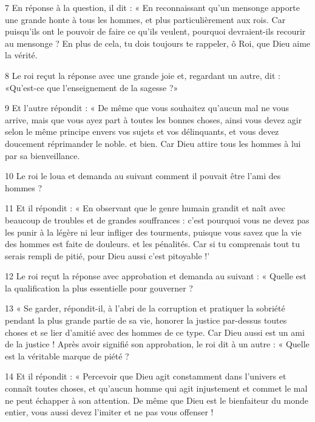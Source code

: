 \par 7 En réponse à la question, il dit : « En reconnaissant qu'un mensonge apporte une grande honte à tous les hommes, et plus particulièrement aux rois. Car puisqu’ils ont le pouvoir de faire ce qu’ils veulent, pourquoi devraient-ils recourir au mensonge ? En plus de cela, tu dois toujours te rappeler, ô Roi, que Dieu aime la vérité.

\par 8 Le roi reçut la réponse avec une grande joie et, regardant un autre, dit : «Qu'est-ce que l'enseignement de la sagesse ?»

\par 9 Et l'autre répondit : « De même que vous souhaitez qu'aucun mal ne vous arrive, mais que vous ayez part à toutes les bonnes choses, ainsi vous devez agir selon le même principe envers vos sujets et vos délinquants, et vous devez doucement réprimander le noble. et bien. Car Dieu attire tous les hommes à lui par sa bienveillance.

\par 10 Le roi le loua et demanda au suivant comment il pouvait être l'ami des hommes ?

\par 11 Et il répondit : « En observant que le genre humain grandit et naît avec beaucoup de troubles et de grandes souffrances : c'est pourquoi vous ne devez pas les punir à la légère ni leur infliger des tourments, puisque vous savez que la vie des hommes est faite de douleurs. et les pénalités. Car si tu comprenais tout tu serais rempli de pitié, pour Dieu aussi c'est pitoyable !'

\par 12 Le roi reçut la réponse avec approbation et demanda au suivant : « Quelle est la qualification la plus essentielle pour gouverner ?

\par 13 « Se garder, répondit-il, à l'abri de la corruption et pratiquer la sobriété pendant la plus grande partie de sa vie, honorer la justice par-dessus toutes choses et se lier d'amitié avec des hommes de ce type. Car Dieu aussi est un ami de la justice ! Après avoir signifié son approbation, le roi dit à un autre : « Quelle est la véritable marque de piété ?

\par 14 Et il répondit : « Percevoir que Dieu agit constamment dans l'univers et connaît toutes choses, et qu'aucun homme qui agit injustement et commet le mal ne peut échapper à son attention. De même que Dieu est le bienfaiteur du monde entier, vous aussi devez l'imiter et ne pas vous offenser !


